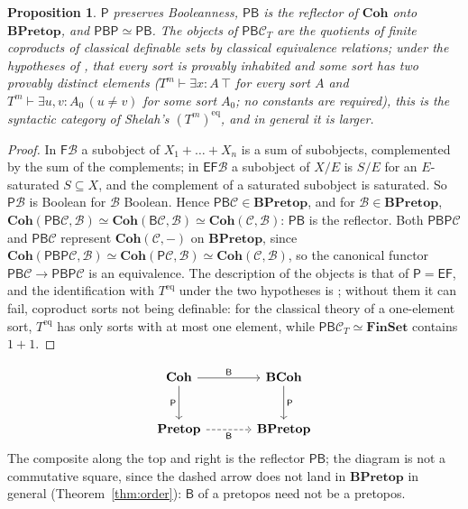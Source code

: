\documentclass[11pt]{amsart}
\newtheorem{prop}[thm]{Proposition}
\theoremstyle{definition}
\newcommand{\Coh}{\mathbf{Coh}}
\newcommand{\BCoh}{\mathbf{BCoh}}
\newcommand{\Pretop}{\mathbf{Pretop}}
\newcommand{\BPretop}{\mathbf{BPretop}}
\newcommand{\FF}{\mathsf F}
\newcommand{\EE}{\mathsf E}
\newcommand{\PP}{\mathsf P}
\newcommand{\BB}{\mathsf B}
\newcommand{\cC}{\mathcal C}
\newcommand{\Fin}{\mathbf{FinSet}}
\begin{document}
\begin{prop}\label{prop:PB}
$\PP$ preserves Booleanness, $\PP\BB$ is the reflector of $\Coh$ onto
$\BPretop$, and $\PP\BB\PP\simeq\PP\BB$. The objects of $\PP\BB\cC_T$ are the quotients of finite
coproducts of classical definable sets by classical equivalence
relations; under the hypotheses of \cite{Harnik11}, that every sort is provably
inhabited and some sort has two provably distinct elements
($T^m\vdash\exists x{:}A\,\top$ for every sort $A$ and $T^m\vdash\exists
u,v{:}A_0\,(u\ne v)$ for some sort $A_0$; no constants are required),
this is the syntactic category of Shelah's $(T^m)^{\mathrm{eq}}$, and in general
it is larger.
\end{prop}
\begin{proof}
In $\FF\mathcal B$ a subobject of $X_1+\dots+X_n$ is a sum of
subobjects, complemented by the sum of the complements; in $\EE\FF\mathcal
B$ a subobject of $X/E$ is $S/E$ for an $E$-saturated $S\subseteq X$, and
the complement of a saturated subobject is saturated. So $\PP\mathcal B$
is Boolean for $\mathcal B$ Boolean. Hence $\PP\BB\cC\in\BPretop$, and for
$\mathcal B\in\BPretop$, $\Coh(\PP\BB\cC,\mathcal B)\simeq\Coh(\BB\cC,
\mathcal B)\simeq\Coh(\cC,\mathcal B)$: $\PP\BB$ is the reflector. Both
$\PP\BB\PP\cC$ and $\PP\BB\cC$ represent $\Coh(\cC,-)$ on $\BPretop$,
since $\Coh(\PP\BB\PP\cC,\mathcal B)\simeq\Coh(\PP\cC,\mathcal B)\simeq
\Coh(\cC,\mathcal B)$, so the canonical functor $\PP\BB\cC\to\PP\BB\PP\cC$
is an equivalence. The description of the objects is that of $\PP=\EE\FF$, and the
identification with $T^{\mathrm{eq}}$ under the two hypotheses is
\cite{Harnik11}; without them it can fail, coproduct sorts not being
definable: for the classical theory of a one-element sort, $T^{\mathrm{eq}}$ has only sorts with at most one
element, while $\PP\BB\cC_T\simeq\Fin$ contains $1+1$.
\end{proof}

\begin{equation}\label{eq:square}
\begin{tikzcd}[column sep=large, row sep=large]
\Coh \arrow[r, "\BB"] \arrow[d, "\PP"'] & \BCoh \arrow[d, "\PP"] \\
\Pretop \arrow[r, "\BB"', dashed] & \BPretop
\end{tikzcd}
\end{equation}
The composite along the top and right is the reflector $\PP\BB$; the
diagram is not a commutative square, since the dashed arrow does not
land in $\BPretop$ in general (Theorem~\ref{thm:order}): $\BB$ of a pretopos need not be a
pretopos.
\end{document}
